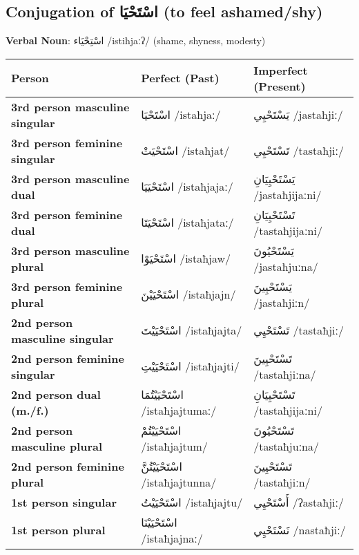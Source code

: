 \documentclass[letterpaper,12pt]{article}
\begin{document}
\subsection{Conjugation of \textarabic{اسْتَحْيَا} (to feel ashamed/shy)}
\par{ \large \textbf{Verbal Noun}: \textarabic{اسْتِحْيَاء} /istiħjaːʔ/ (shame, shyness, modesty)}

\begin{longtable}{|>{\raggedright}p{3.5cm}|p{5cm}|p{5cm}|}
\hline
\textbf{Person} & \textbf{Perfect (Past)} & \textbf{Imperfect (Present)} \\
\hline
\textbf{3rd person masculine singular} & \textarabic{اسْتَحْيَا} /istaħjaː/ & \textarabic{يَسْتَحْيِي} /jastaħjiː/ \\
\hline
\textbf{3rd person feminine singular} & \textarabic{اسْتَحْيَتْ} /istaħjat/ & \textarabic{تَسْتَحْيِي} /tastaħjiː/ \\
\hline
\textbf{3rd person masculine dual} & \textarabic{اسْتَحْيَيَا} /istaħjajaː/ & \textarabic{يَسْتَحْيِيَانِ} /jastaħjijaːni/ \\
\hline
\textbf{3rd person feminine dual} & \textarabic{اسْتَحْيَتَا} /istaħjataː/ & \textarabic{تَسْتَحْيِيَانِ} /tastaħjijaːni/ \\
\hline
\textbf{3rd person masculine plural} & \textarabic{اسْتَحْيَوْا} /istaħjaw/ & \textarabic{يَسْتَحْيُونَ} /jastaħjuːna/ \\
\hline
\textbf{3rd person feminine plural} & \textarabic{اسْتَحْيَيْنَ} /istaħjajn/ & \textarabic{يَسْتَحْيِينَ} /jastaħjiːn/ \\
\hline
\textbf{2nd person masculine singular} & \textarabic{اسْتَحْيَيْتَ} /istaħjajta/ & \textarabic{تَسْتَحْيِي} /tastaħjiː/ \\
\hline
\textbf{2nd person feminine singular} & \textarabic{اسْتَحْيَيْتِ} /istaħjajti/ & \textarabic{تَسْتَحْيِينَ} /tastaħjiːna/ \\
\hline
\textbf{2nd person dual (m./f.)} & \textarabic{اسْتَحْيَيْتُمَا} /istaħjajtumaː/ & \textarabic{تَسْتَحْيِيَانِ} /tastaħjijaːni/ \\
\hline
\textbf{2nd person masculine plural} & \textarabic{اسْتَحْيَيْتُمْ} /istaħjajtum/ & \textarabic{تَسْتَحْيُونَ} /tastaħjuːna/ \\
\hline
\textbf{2nd person feminine plural} & \textarabic{اسْتَحْيَيْتُنَّ} /istaħjajtunna/ & \textarabic{تَسْتَحْيِينَ} /tastaħjiːn/ \\
\hline
\textbf{1st person singular} & \textarabic{اسْتَحْيَيْتُ} /istaħjajtu/ & \textarabic{أَسْتَحْيِي} /ʔastaħjiː/ \\
\hline
\textbf{1st person plural} & \textarabic{اسْتَحْيَيْنَا} /istaħjajnaː/ & \textarabic{نَسْتَحْيِي} /nastaħjiː/ \\
\hline
\end{longtable}
\end{document}
